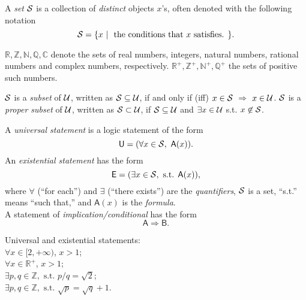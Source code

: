 \begin{defn}
  A \emph{set} ${\cal S}$
  is a collection of \emph{distinct} objects $x$'s,
   often denoted with the following notation
   \begin{equation}
     \label{eq:setNotation}
     {\cal S} = \{ x\ |\ \text{ the conditions that $x$ satisfies. } \}.
   \end{equation}
\end{defn}

\begin{ntn}
$\mathbb{R}, \mathbb{Z}, \mathbb{N}, \mathbb{Q}, \mathbb{C}$
 denote 
 the sets of real numbers, integers, natural numbers,
 rational numbers and complex numbers, respectively.
$\mathbb{R}^+, \mathbb{Z}^+, \mathbb{N}^+, \mathbb{Q}^+$
 the sets of positive such numbers.
\end{ntn}

 \begin{defn}
   ${\cal S}$ is a \emph{subset} of ${\cal U}$,
    written as ${\cal S}\subseteq {\cal U}$,
   if and only if (iff) $x\in {\cal S}$ $\Rightarrow$ $x\in {\cal U}$.
   ${\cal S}$ is a \emph{proper subset} of ${\cal U}$,
    written as ${\cal S}\subset {\cal U}$,
    if ${\cal S}\subseteq {\cal U}$
    and $\exists x\in {\cal U}$ s.t. $x\not\in{\cal S}$.
 \end{defn}

\begin{defn}
\label{def:uni_exist}
A \emph{universal statement} is a logic statement 
 of the form
\begin{equation}
  \mathsf{U} = (\forall x\in {\cal S},\ \mathsf{A}(x) ).
\end{equation}
An \emph{existential statement} has the form
\begin{equation}
  \mathsf{E} = (\exists x\in {\cal S},\text{ s.t. } \mathsf{A}(x)),
\end{equation}
 where 
 $\forall$ (``for each'') and $\exists$ (``there exists'')
 are the \emph{quantifiers}, ${\cal S}$ is a set,
 ``s.t.'' means ``such that,''
 and $\mathsf{A}(x)$ is the \emph{formula}.\\
A statement of \emph{implication/conditional}
 has the form
 \begin{equation}
   \mathsf{A}\Rightarrow \mathsf{B}.
 \end{equation}
\end{defn}

 \begin{exm}
   Universal and existential statements:\\
   $\forall x\in[2,+\infty)$, $x>1$;\\
   $\forall x\in \mathbb{R}^+$, $x>1$;\\
   $\exists p,q\in \mathbb{Z}, \text{ s.t. } p/q = \sqrt{2}$;\\
   $\exists p,q\in \mathbb{Z}, \text{ s.t. } \sqrt{p} = \sqrt{q}+1$.
 \end{exm}

